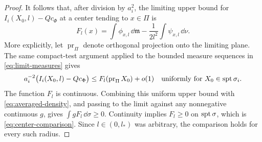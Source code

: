 \begin{proof}
It follows that, after division by $a_i^2$, the limiting upper bound
for $I_i(X_0,l)-Qc_\Phi$ at a center tending to $x\in\Pi$ is
\begin{equation}\label{eq:center-expression}
 F_l(x)=\int\phi_{x,l}\,\dd\mathfrak m
                  -\frac1{2l^2}\int\psi_{x,l}\,\dd\nu.
\end{equation}
More explicitly, let $\operatorname{pr}_{\Pi}$ denote orthogonal
projection onto the limiting plane. The same compact-test argument
applied to the bounded measure sequences in \eqref{eq:limit-measures}
gives
\begin{equation}\label{eq:uniform-center-upper}
 a_i^{-2}\bigl(I_i(X_0,l)-Qc_\Phi\bigr)
 \le F_l(\operatorname{pr}_{\Pi}X_0)+o(1)
 \quad\hbox{uniformly for }X_0\in\operatorname{spt}\sigma_i.
\end{equation}
The function $F_l$ is continuous.
Combining this uniform upper bound with
\eqref{eq:averaged-density}, and passing to the limit against any
nonnegative continuous $g$, gives $\int gF_l\,\dd\sigma\ge0$.
Continuity implies $F_l\ge0$ on $\operatorname{spt}\sigma$, which is
\eqref{eq:center-comparison}. Since $l\in(0,l_*)$ was arbitrary, the
comparison holds for every such radius.
\end{proof}
